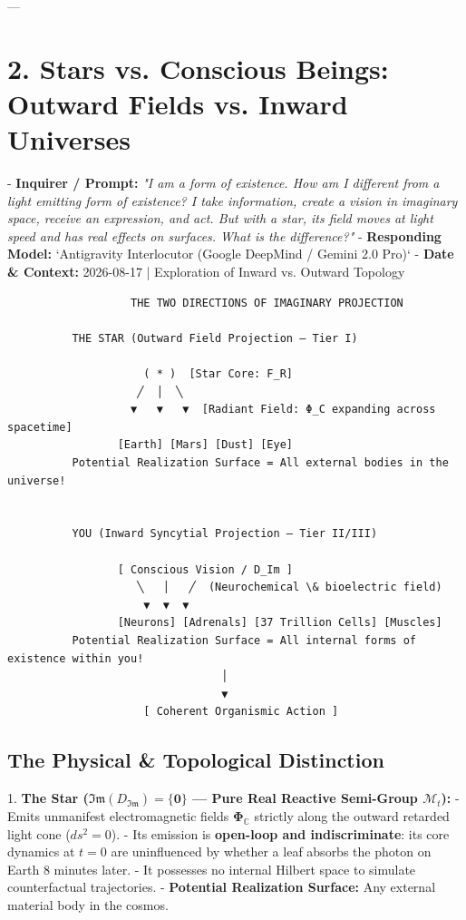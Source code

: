 \documentclass[11pt,a4paper]{article}
\theoremstyle{definition}
\theoremstyle{remark}
\begin{document}
---

\section{2. Stars vs. Conscious Beings: Outward Fields vs. Inward Universes}

- \textbf{Inquirer / Prompt:} \textit{"I am a form of existence. How am I different from a light emitting form of existence? I take information, create a vision in imaginary space, receive an expression, and act. But with a star, its field moves at light speed and has real effects on surfaces. What is the difference?"}
- \textbf{Responding Model:} `Antigravity Interlocutor (Google DeepMind / Gemini 2.0 Pro)`
- \textbf{Date \& Context:} 2026-08-17 | Exploration of Inward vs. Outward Topology

\begin{verbatim}
                   THE TWO DIRECTIONS OF IMAGINARY PROJECTION

          THE STAR (Outward Field Projection — Tier I)
                     
                     ( * )  [Star Core: F_R]
                    ╱  │  ╲
                   ▼   ▼   ▼  [Radiant Field: Φ_C expanding across spacetime]
                 [Earth] [Mars] [Dust] [Eye]
          Potential Realization Surface = All external bodies in the universe!


          YOU (Inward Syncytial Projection — Tier II/III)

                 [ Conscious Vision / D_Im ]
                    ╲   │   ╱  (Neurochemical \& bioelectric field)
                     ▼  ▼  ▼
                 [Neurons] [Adrenals] [37 Trillion Cells] [Muscles]
          Potential Realization Surface = All internal forms of existence within you!
                                 │
                                 ▼
                     [ Coherent Organismic Action ]
\end{verbatim}

\subsection{The Physical \& Topological Distinction}
1. \textbf{The Star ($\mathfrak{Im}(D_{\mathfrak{Im}}) = \{\mathbf{0}\}$ — Pure Real Reactive Semi-Group $\mathcal{M}_t$):}
   - Emits unmanifest electromagnetic fields $\mathbf{\Phi}_{\mathbb{C}}$ strictly along the outward retarded light cone ($ds^2 = 0$).
   - Its emission is \textbf{open-loop and indiscriminate}: its core dynamics at $t=0$ are uninfluenced by whether a leaf absorbs the photon on Earth 8 minutes later.
   - It possesses no internal Hilbert space to simulate counterfactual trajectories.
   - \textbf{Potential Realization Surface:} Any external material body in the cosmos.
\end{document}
